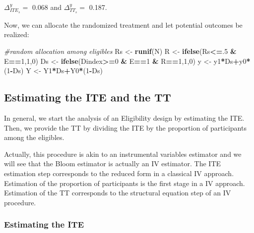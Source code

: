 \documentclass[]{book}
\newenvironment{Shaded}{\begin{snugshade}}{\end{snugshade}}
\newcommand{\CommentTok}[1]{\textcolor[rgb]{0.56,0.35,0.01}{\textit{#1}}}
\newcommand{\DecValTok}[1]{\textcolor[rgb]{0.00,0.00,0.81}{#1}}
\newcommand{\KeywordTok}[1]{\textcolor[rgb]{0.13,0.29,0.53}{\textbf{#1}}}
\newcommand{\NormalTok}[1]{#1}
\newcommand{\OperatorTok}[1]{\textcolor[rgb]{0.81,0.36,0.00}{\textbf{#1}}}
\newcommand{\StringTok}[1]{\textcolor[rgb]{0.31,0.60,0.02}{#1}}
\theoremstyle{definition}
\theoremstyle{definition}
\theoremstyle{definition}
\theoremstyle{remark}
\begin{document}
\(\Delta^y_{ITE_s}=\) 0.068 and \(\Delta^y_{TT_s}=\) 0.187.

Now, we can allocate the randomized treatment and let potential outcomes be realized:

\begin{Shaded}
\begin{Highlighting}[]
\CommentTok{#random allocation among eligibles}
\NormalTok{Rs <-}\StringTok{ }\KeywordTok{runif}\NormalTok{(N)}
\NormalTok{R <-}\StringTok{ }\KeywordTok{ifelse}\NormalTok{(Rs}\OperatorTok{<=}\NormalTok{.}\DecValTok{5} \OperatorTok{&}\StringTok{ }\NormalTok{E}\OperatorTok{==}\DecValTok{1}\NormalTok{,}\DecValTok{1}\NormalTok{,}\DecValTok{0}\NormalTok{)}
\NormalTok{Ds <-}\StringTok{ }\KeywordTok{ifelse}\NormalTok{(Dindex}\OperatorTok{>=}\DecValTok{0} \OperatorTok{&}\StringTok{ }\NormalTok{E}\OperatorTok{==}\DecValTok{1} \OperatorTok{&}\StringTok{ }\NormalTok{R}\OperatorTok{==}\DecValTok{1}\NormalTok{,}\DecValTok{1}\NormalTok{,}\DecValTok{0}\NormalTok{)}
\NormalTok{y <-}\StringTok{ }\NormalTok{y1}\OperatorTok{*}\NormalTok{Ds}\OperatorTok{+}\NormalTok{y0}\OperatorTok{*}\NormalTok{(}\DecValTok{1}\OperatorTok{-}\NormalTok{Ds)}
\NormalTok{Y <-}\StringTok{ }\NormalTok{Y1}\OperatorTok{*}\NormalTok{Ds}\OperatorTok{+}\NormalTok{Y0}\OperatorTok{*}\NormalTok{(}\DecValTok{1}\OperatorTok{-}\NormalTok{Ds)}
\end{Highlighting}
\end{Shaded}

\hypertarget{estimating-the-ite-and-the-tt}{%
\subsection{Estimating the ITE and the TT}\label{estimating-the-ite-and-the-tt}}

In general, we start the analysis of an Eligibility design by estimating the ITE.
Then, we provide the TT by dividing the ITE by the proportion of participants among the eligibles.

Actually, this procedure is akin to an instrumental variables estimator and we will see that the Bloom estimator is actually an IV estimator.
The ITE estimation step corresponds to the reduced form in a classical IV approach.
Estimation of the proportion of participants is the first stage in a IV approach.
Estimation of the TT corresponds to the structural equation step of an IV procedure.

\hypertarget{estimating-the-ite}{%
\subsubsection{Estimating the ITE}\label{estimating-the-ite}}
\end{document}
